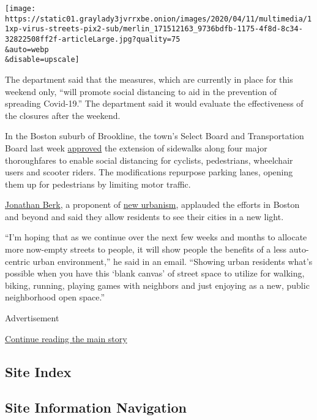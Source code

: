 \texttt{[image: https://static01.graylady3jvrrxbe.onion/images/2020/04/11/multimedia/11xp-virus-streets-pix2-sub/merlin\_171512163\_9736bdfb-1175-4f8d-8c34-32822508ff2f-articleLarge.jpg?quality=75\\\&auto=webp\\\&disable=upscale]}

The department said that the measures, which are currently in place for
this weekend only, ``will promote social distancing to aid in the
prevention of spreading Covid-19.'' The department said it would
evaluate the effectiveness of the closures after the weekend.

In the Boston suburb of Brookline, the town's Select Board and
Transportation Board last week
\href{https://twitter.com/BlineTransport/status/1248048199601999875}{approved}
the extension of sidewalks along four major thoroughfares to enable
social distancing for cyclists, pedestrians, wheelchair users and
scooter riders. The modifications repurpose parking lanes, opening them
up for pedestrians by limiting motor traffic.

\href{https://medium.com/placemakers/our-cities-are-a-blank-canvas-what-do-we-want-to-paint-2170fa55e88f}{Jonathan
Berk}, a proponent of
\href{http://www.newurbanism.org/newurbanism/principles.html}{new
urbanism}, applauded the efforts in Boston and beyond and said they
allow residents to see their cities in a new light.

``I'm hoping that as we continue over the next few weeks and months to
allocate more now-empty streets to people, it will show people the
benefits of a less auto-centric urban environment,'' he said in an
email. ``Showing urban residents what's possible when you have this
`blank canvas' of street space to utilize for walking, biking, running,
playing games with neighbors and just enjoying as a new, public
neighborhood open space.''

Advertisement

\protect\hyperlink{after-bottom}{Continue reading the main story}

\hypertarget{site-index}{%
\subsection{Site Index}\label{site-index}}

\hypertarget{site-information-navigation}{%
\subsection{Site Information
Navigation}\label{site-information-navigation}}

